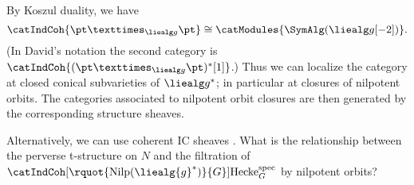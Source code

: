 \documentclass[english]{short-notes}
\newcommand\sHecke[1]{\operatorname{Hecke}_#1^{\mathrm{spec}}}
\newcommand\sHeckeCat[1]{\catIndCoh[\rquot{\mathrm{Nilp}(\liealg{\MakeLowercase{#1}}^*)}{#1}]{\sHecke G}}
\begin{document}
By Koszul duality, we have
\[
    \catIndCoh{\pt ×_{\liealg g} \pt} \cong \catModules{\SymAlg(\liealg g[-2])}.
\]
(In David's notation the second category is $\catIndCoh{(\pt ×_{\liealg g} \pt)^*[1]}$.)
Thus we can localize the category at closed conical subvarieties of $\liealg g^*$; in particular at closures of nilpotent orbits.
The categories associated to nilpotent orbit closures are then generated by the corresponding structure sheaves.

Alternatively, we can use coherent IC sheaves \cite{ArinkinBezrukavnikov:arXiv:PerverseCoherentSheaves}.
What is the relationship between the perverse t-structure on $N$ and the filtration of $\sHeckeCat G$ by nilpotent orbits?

\printbibliography
\end{document}
